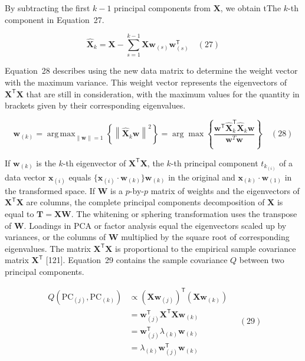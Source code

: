 \documentclass[preprint,12pt]{elsarticle}
\begin{document}
By subtracting the first $k - 1$ principal components from $\mathbf{X}$, we obtain tThe $k$-th component in Equation~27.

\begin{equation}
	\mathbf{\hat{X}}_{k}=\mathbf{X} -\sum_{s=1}^{k-1}\mathbf{X} \mathbf{w}_{\left(s\right)}\mathbf{w}_{\left(s\right)}^{\mathsf{T}}
	\quad\left(27\right)
\end{equation}

Equation~28 describes using the new data matrix to determine the weight vector with the maximum variance. This weight vector represents the eigenvectors of $\mathbf{X}^{\mathsf{T}}\mathbf{X}$ that are still in consideration, with the maximum values for the quantity in brackets given by their corresponding eigenvalues. 

\begin{equation}
	\mathbf{w}_{\left(k\right)}=\mathop{\operatorname{arg\,max}}_{\left\|\mathbf{w} \right\|=1}\left\{\left\|\mathbf{\hat{X}}_{k}\mathbf{w} \right\|^{2}\right\}=\arg \max \left\{{\frac{\mathbf{w}^{\mathsf{T}}\mathbf{\hat{X}}_{k}^{\mathsf{T}}\mathbf{\hat{X}}_{k}\mathbf{w}}{\mathbf{w}^{T}\mathbf{w}}}\right\}
	\quad\left(28\right)
\end{equation}

If $\mathbf{w}_{\left(k\right)}$ is the $k$-th eigenvector of $\mathbf{X}^{\mathsf{T}}\mathbf{X}$, the $k$-th principal component $t_{k_{\left(i\right)}}$ of a data vector $\mathbf{x}_{\left(i\right)}$ equals $\{\mathbf{x}_{\left(i\right)} \cdot \mathbf{w}_{\left(k\right)}\} \mathbf{w}_{\left(k\right)}$ in the original and $\mathbf{x}_{\left(k\right)} \cdot \mathbf{w}_{\left(1\right)}$ in the transformed space. If $\mathbf{W}$ is a $p$-by-$p$ matrix of weights and the eigenvectors of $\mathbf{X}^{\mathsf{T}}\mathbf{X}$ are columns, the complete principal components decomposition of $\mathbf{X}$ is equal to $\mathbf{T} =\mathbf{X} \mathbf{W}$. The whitening or sphering transformation uses the transpose of $\mathbf{W}$. Loadings in PCA or factor analysis equal the eigenvectors scaled up by variances, or the columns of $\mathbf{W}$ multiplied by the square root of corresponding eigenvalues. The matrix $\mathbf{X}^{\mathsf{T}}\mathbf{X}$ is proportional to the empirical sample covariance matrix $\mathbf{X}^{\mathsf{T}}$ [121]. Equation~29 contains the sample covariance $Q$ between two principal components.

\begin{equation}
	\begin{aligned}
        Q(\mathrm{PC}_{(j)},\mathrm{PC}_{\left(k\right)})&\propto (\mathbf{X} \mathbf{w}_{(j)})^{\mathsf{T}}(\mathbf{X} \mathbf{w}_{\left(k\right)})\\&=\mathbf{w}_{(j)}^{\mathsf{T}}\mathbf{X}^{\mathsf{T}}\mathbf{X} \mathbf{w}_{\left(k\right)}\\&=\mathbf{w}_{(j)}^{\mathsf{T}}\lambda_{\left(k\right)}\mathbf{w}_{\left(k\right)}\\&=\lambda_{\left(k\right)}\mathbf{w}_{(j)}^{\mathsf{T}}\mathbf{w}_{\left(k\right)}
    \end{aligned}
	\quad\left(29\right)
\end{equation}
\end{document}
